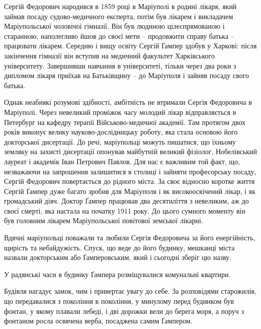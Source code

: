 
Сергій Федорович народився в 1859 році в Маріуполі в родині лікаря, який займав
посаду судово-медичного експерта, потім був лікарем і викладачем Маріупольської
чоловічої гімназії. Він був людиною цілеспрямованою і старанною, наполегливо
йшов до своєї мети – продовжити справу батька – працювати лікарем. Середню і
вищу освіту Сергій Ґампер здобув у Харкові: після закінчення гімназії він
вступив на медичний факультет Харківського університету. Завершивши навчання в
університеті, тільки через два роки з дипломом лікаря приїхав на Батьківщину –
до Маріуполя і зайняв посаду свого батька.

Однак неабиякі розумові здібності, амбітність не втримали Сергія Федоровича в
Маріуполі. Через невеликий проміжок часу молодий лікар відправляється в
Петербург на кафедру терапії Військово-медичної академії. Там протягом двох
років виконує велику науково-дослідницьку роботу, яка стала основою його
докторської дисертації. До речі, маріупольці можуть пишатися, що їхньому
земляку на захисті дисертації опонував майбутній великий фізіолог, Нобелівський
лауреат і академік Іван Петрович Павлов. Для нас є важливим той факт, що,
незважаючи на запрошення залишитися в столиці і зайняти професорську посаду,
Сергій Федорович повертається до рідного міста. За своє відносно коротке життя
Сергій Ґампер дуже багато зробив для Маріуполя і як високоосвічений лікар, і як
громадський діяч. Доктор Ґампер працював два десятиліття з невеликим, аж до
своєї смерті, яка настала на початку 1911 року. До цього сумного моменту він
був головним лікарем Маріупольської повітової земської лікарні.


Вдячні маріупольці поважали та любили Сергія Федоровича за його енергійність,
щирість та небайдужість. Спуск, що веде до його будинку, мешканці міста назвали
докторським або Ґамперовським, який і сьогодні зберіг цю назву.

У радянські часи в будинку Ґампера розміщувалися комунальні квартири.

Будівля нагадує замок, чим і привертає увагу до себе. За розповідями
старожилів, що передавалися з покоління в покоління, у минулому перед будинком
був фонтан, у якому плавали лебеді, і дві дорожки вели до берега моря, а поруч
з фонтаном росла освячена верба, посаджена самим Ґампером.


